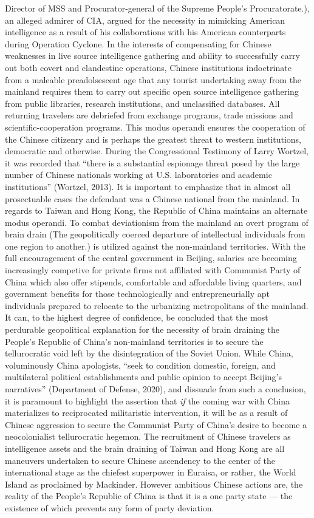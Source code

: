 \documentclass[12pt]{article}
\begin{document}
Director of MSS and Procurator-general of the Supreme People's Procuratorate.), an alleged admirer of CIA, argued for the necessity in mimicking American intelligence as a result of his collaborations with his American counterparts during Operation Cyclone. In the interests of compensating for Chinese weaknesses in live source intelligence gathering and ability to successfully carry out both covert and clandestine operations, Chinese institutions indoctrinate from a maleable preadolsescent age that any tourist undertaking away from the mainland requires them to carry out specific open source intelligence gathering from public libraries, research institutions, and unclassified databases. All returning travelers are debriefed from exchange programs, trade missions and scientific-cooperation programs. This modus operandi ensures the cooperation of the Chinese citizenry and is perhaps the greatest threat to western institutions, democratic and otherwise. During the Congressional Testimony of Larry Wortzel, it was recorded that “there is a substantial espionage threat posed by the large number of Chinese nationals working at U.S. laboratories and academic institutions”  (Wortzel, 2013). It is important to emphasize that in almost all prosectuable cases the defendant was a Chinese national from the mainland. In regards to Taiwan and Hong Kong, the Republic of China maintains an alternate modus operandi. To combat deviationism from the mainland an overt program of brain drain (The geopolitically coerced departure of intellectual individuals from one region to another.) is utilized against the non-mainland territories. With the full encouragement of the central government in Beijing, salaries are becoming increasingly competive for private firms not affiliated with Communist Party of China which also offer stipends, comfortable and affordable living quarters, and government benefits for those technologically and entrepreneurially apt individuals prepared to relocate to the urbanizing metropolitans of the mainland. It can, to the highest degree of confidence, be concluded that the most perdurable geopolitical explanation for the necessity of brain draining the People's Republic of China's non-mainland territories is to secure the tellurocratic void left by the disintegration of the Soviet Union. While China, voluminously China apologists, “seek to condition domestic, foreign, and multilateral political establishments and public opinion to accept Beijing's narratives” (Department of Defense, 2020), and dissuade from such a conclusion, it is paramount to highlight the assertion that \emph{if} the coming war with China materializes to reciprocated militaristic intervention, it will be as a result of Chinese aggression to secure the Communist Party of China's desire to become a neocolonialist tellurocratic hegemon. The recruitment of Chinese travelers as intelligence assets and the brain draining of Taiwan and Hong Kong are all maneuvers undertaken to secure Chinese ascendency to the center of the international stage as the chiefest superpower in Euraisa, or rather, the World Island as proclaimed by Mackinder. However ambitious Chinese actions are, the reality of the People's Republic of China is that it is a one party state — the existence of which prevents any form of party deviation. 
\end{document}
